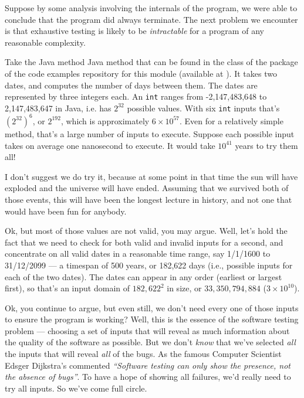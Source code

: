 Suppose by some analysis involving the internals of the program, we were able to
conclude that the program did always terminate. The next problem we encounter is
that exhaustive testing is likely to be {\it intractable} for a program of any
reasonable complexity. 


Take the Java method \daysbetweentwodatesmethod Java method that can be found in
the \calendarclass class of the \lecturespackage package of the code examples
repository for this module (available at \coderepourl). It takes two dates,
and computes the number of days between them. The dates are represented by three
integers each. An {\tt int} ranges from -2,147,483,648 to 2,147,483,647 in Java,
i.e. has $2^{32}$ possible values. With six {\tt int} inputs that's
${(2^{32})}^6$, or $2^{192}$, which is approximately $6 \times {10}^{57}$. Even
for a relatively simple method, that's a large number of inputs to execute.
Suppose each possible input takes on average one nanosecond to execute. It would
take ${10}^{41}$ years to try them all!

I don't suggest we do try it, because at some point in that time the sun will
have exploded and the universe will have ended. Assuming that we survived both
of those events, this will have been the longest lecture in history, and not one
that would have been fun for anybody.

Ok, but most of those values are not valid, you may argue. Well, let's hold the
fact that we need to check for both valid and invalid inputs for a second, and
concentrate on all valid dates in a reasonable time range, say 1/1/1600 to
31/12/2099 --- a timespan of 500 years, or 182,622 days (i.e., possible inputs
for each of the two dates). The dates can appear in any order (earliest or
largest first), so that's an input domain of ${182,622}^2$ in size, or
$33,350,794,884$ ($3 \times {10}^{10}$).



Ok, you continue to argue, but even still, we don't need every one of those
inputs to ensure the program is working? Well, this is the essence of the
software testing problem --- choosing a set of inputs that will reveal as much
information about the quality of the software as possible. But we don't {\it
know} that we've selected {\it all} the inputs that will reveal {\it all} of the
bugs. As the famous Computer Scientist Edsger Dijkstra's commented {\it
``Software testing can only show the presence, not the absence of bugs''}.
To have a hope of showing all failures, we'd really need to try all inputs. So
we've come full circle. 

